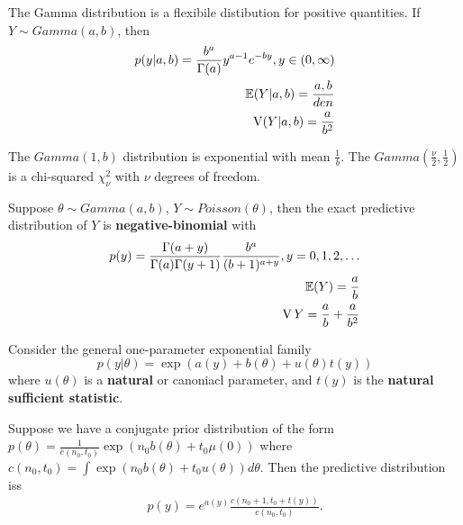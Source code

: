 \begin{defn}
  \label{sec:prob-bayes-theor-8}
  The Gamma distribution is a flexibile distibution for positive
  quantities.  If $Y \sim Gamma(a, b)$, then
  \begin{align}
    \label{eq:6}
    p(y|a,b) = \frac{b^{a}}{\Gamma(a)} y^{a-1} e^{-by}, y \in (0,
    \infty) \\
    \E{Y|a, b} = \frac{a, b}{den} \\
    \V(Y|a, b) = \frac{a}{b^{2}}
  \end{align}

  The $Gamma(1, b)$ distribution is exponential with mean
  $\frac{1}{b}$. The $Gamma(\frac{\nu}{2}, \frac{1}{2})$ is a
  chi-squared $\chi^{2}_{\nu}$ with $\nu$ degrees of freedom.
\end{defn}

\begin{thm}
  \label{sec:prob-bayes-theor-9}
  Suppose $\theta \sim Gamma(a, b)$, $Y \sim Poisson(\theta)$, then
  the exact predictive distribution of $Y$ is
  \textbf{negative-binomial} with
  \begin{align}
    \label{eq:8}
    p(y) = \frac{\Gamma(a+y)}{\Gamma(a) \Gamma(y+1)}
    \frac{b^{a}}{(b+1)^{a+y}}, y= 0, 1, 2, \dots \\
    \E{Y} = \frac{a}{b} \\
    \V{Y} = \frac{a}{b} + \frac{a}{b^{2}}
  \end{align}
\end{thm}

\begin{thm}
  \label{sec:prob-bayes-theor-10}
  Consider the general one-parameter exponential family
  \begin{equation}
    \label{eq:9}
    p(y|\theta) = \exp(a(y) + b(\theta) + u(\theta)t(y))
  \end{equation} where $u(\theta)$ is a \textbf{natural} or canoniacl
  parameter, and $t(y)$ is the \textbf{natural sufficient statistic}.

  Suppose we have a conjugate prior distribution of the form
  $p(\theta) = \frac{1}{c(n_{0}, t_{0})} \exp(n_{0} b(\theta) + t_{0}
  \mu(0))$ where $c(n_{0}, t_{0}) = \int \exp(n_{0} b(\theta) + t_{0}
  u(\theta)) d\theta$.  Then the predictive distribution iss
  \begin{align}
    \label{eq:10}
    p(y) = e^{a(y)} \frac{c(n_{0} + 1, t_{0} + t(y))}{c(n_{0}, t_{0})}.
  \end{align}
\end{thm}


